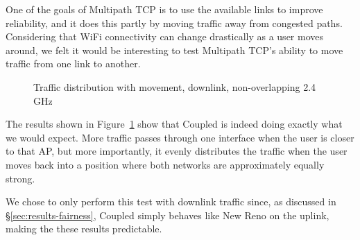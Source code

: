 One of the goals of Multipath TCP is to use the available links to improve
reliability, and it does this partly by moving traffic away from congested
paths. Considering that WiFi connectivity can change drastically as a user moves
around, we felt it would be interesting to test Multipath TCP's ability to move
traffic from one link to another.

\begin{figure}[h]
 \centering
 
 \caption{Traffic distribution with movement, downlink, non-overlapping 2.4 GHz}\label{graph:mobility}
\end{figure}

The results shown in Figure~\ref{graph:mobility} show that Coupled is indeed
doing exactly what we would expect. More traffic passes through one interface
when the user is closer to that AP, but more importantly, it evenly distributes
the traffic when the user moves back into a position where both networks are
approximately equally strong.

We chose to only perform this test with downlink traffic since, as discussed in
\S\ref{sec:results-fairness}, Coupled simply behaves like New Reno on the
uplink, making the these results predictable.

